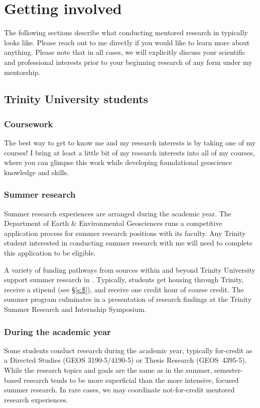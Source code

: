 
\section{Getting involved}
The following sections describe what conducting mentored research in \grackle{} typically looks like. 
Please reach out to me directly if you would like to learn more about anything. 
Please note that in all cases, we will explicitly discuss your scientific and professional interests prior to your beginning research of any form under my mentorship.

\subsection{Trinity University students}
\subsubsection{Coursework}
The best way to get to know me and my research interests is by taking one of my courses! 
I bring at least a little bit of my research interests into all of my courses, where you can glimpse this work while developing foundational geoscience knowledge and skills. 

\subsubsection{Summer research}
Summer research experiences are arranged during the academic year. 
The Department of Earth \& Environmental Geosciences runs a competitive application process for summer research positions with its faculty.
Any Trinity student interested in conducting summer research with me  will need to complete this application to be eligible.

A variety of funding pathways from sources within and beyond Trinity University support summer research in \grackle{}.
Typically, students get housing through Trinity, receive a stipend (see \S\ref{s:$}), and receive one credit hour of course credit.
The summer program culminates in a presentation of research findings at the Trinity Summer Research and Internship Symposium. 

\subsubsection{During the academic year}
Some students conduct research during the academic year, typically for-credit as a Directed Studies (GEOS 3190-5/4190-5) or Thesis Research (GEOS~4395-5). 
While the research topics and goals are the same as in the summer, semester-based research tends to be more superficial than the more intensive, focused summer research.
In rare cases, we may coordinate not-for-credit mentored research experiences. 

